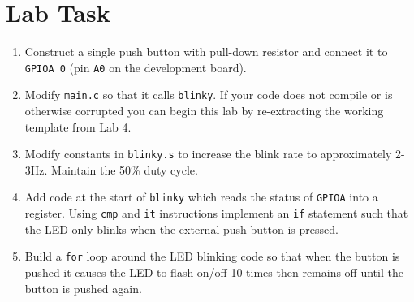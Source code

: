 \documentclass{UoNMCHA}
\numberwithin{equation}{section}
\begin{document}
\section{Lab Task}

\begin{enumerate}
    \item Construct a single push button with pull-down resistor and connect it to \texttt{GPIOA 0} (pin \texttt{A0} on the development board).
    \item Modify \texttt{main.c} so that it calls \texttt{blinky}. If your code does not compile or is otherwise corrupted you can begin this lab by re-extracting the working template from Lab 4.
    \item Modify constants in \texttt{blinky.s} to increase the blink rate to approximately 2-3Hz. Maintain the 50\% duty cycle.
    \item Add code at the start of \texttt{blinky} which reads the status of \texttt{GPIOA} into a register. Using \texttt{cmp} and \texttt{it} instructions implement an \texttt{if} statement such that the LED only blinks when the external push button is pressed.
    \item Build a \texttt{for} loop around the LED blinking code so that when the button is pushed it causes the LED to flash on/off 10 times then remains off until the button is pushed again.
\end{enumerate}
\end{document}
